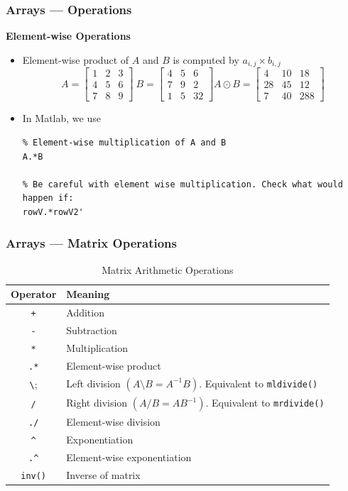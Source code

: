 \documentclass[11pt,xcolor={svgnames},aspectratio=169,usepdftitle=false]{beamer}
\begin{document}
\begin{frame}[fragile]
    \frametitle{Arrays --- Operations}
    \alert{\textbf{Element-wise Operations}}
\begin{itemize}
    \item Element-wise product of $A$ and $B$ is computed by $a_{i,j}\times b_{i,j}$
    \[
    A = \begin{bmatrix}
        1 & 2 & 3 \\
        4 & 5 & 6 \\
        7 & 8 & 9 
        \end{bmatrix} \ 
    B = \begin{bmatrix}
        4 & 5 & 6 \\
        7 & 9 & 2 \\
        1 & 5 & 32
        \end{bmatrix}
    A \odot B = 
    \begin{bmatrix}
        4  &  10 &   18 \\
        28  &  45 &   12 \\
        7  &  40 &  288
    \end{bmatrix}    
    \]
    \item In Matlab, we use
\begin{lstlisting}
% Element-wise multiplication of A and B
A.*B
    
% Be careful with element wise multiplication. Check what would happen if:
rowV.*rowV2'
\end{lstlisting}
\end{itemize}
\end{frame}

\begin{frame}[fragile]
    \frametitle{Arrays --- Matrix Operations}
    \begin{table}[htbp]
        \caption{Matrix Arithmetic Operations}
        \label{tab:matrix_operators}
        \begin{tabular}{@{}cl@{}}
        \toprule
        Operator & Meaning \\ \midrule
        \verb;+;  & Addition \\ 
        \verb;-;  & Subtraction \\ 
        \verb;*;  & Multiplication \\ 
        \verb;.*; & Element-wise product \\
        \verb;\;  & Left division $(A \setminus B = A^{-1}B)$. Equivalent to \verb;mldivide(); \\
        \verb;/;  & Right division $(A / B = AB^{-1})$. Equivalent to \verb;mrdivide(); \\
        \verb;./; & Element-wise division \\ 
        \verb;^;  & Exponentiation \\
        \verb;.^;  & Element-wise exponentiation \\
        \verb;inv(); & Inverse of matrix \\ \bottomrule
        \end{tabular}
    \end{table}
\end{frame}
\end{document}
